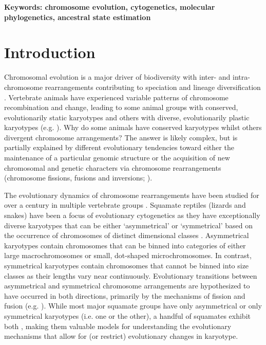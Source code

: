 \documentclass[a4paper, 12pt]{article}
\begin{document}
\textbf{Keywords: chromosome evolution, cytogenetics, molecular phylogenetics, ancestral state estimation}


\section{Introduction}\label{main}

Chromosomal evolution is a major driver of biodiversity with inter- and intra-chromosome rearrangements contributing to speciation and lineage diversification \citep{pellestor2020chromoanagenesis}. 
Vertebrate animals have experienced variable patterns of chromosome recombination and change, leading to some animal groups with conserved, evolutionarily static karyotypes and others with diverse, evolutionarily plastic karyotypes (e.g. \citealt{graphodatsky2011genome,neto2011extensive,mezzasalma2019changes,degrandi2020distribution,mayrose2021evolution}).
Why do some animals have conserved karyotypes whilst others divergent chromosome arrangements? 
The answer is likely complex, but is partially explained by different evolutionary tendencies toward either the maintenance of a particular genomic structure or the acquisition of new chromosomal and genetic characters via chromosome rearrangements (chromosome fissions, fusions and inversions; \citealt{crombach2007chromosome,amorim2021new}).

The evolutionary dynamics of chromosome rearrangements have been studied for over a century in multiple vertebrate groups \citep{damas2021vertebrate}. 
Squamate reptiles (lizards and snakes) have been a focus of evolutionary cytogenetics as they have exceptionally diverse karyotypes that can be either ‘asymmetrical’ or ‘symmetrical’ based on the occurrence of chromosomes of distinct dimensional classes \citep{stebbins1950chapter,white1973}. 
Asymmetrical karyotypes contain chromosomes that can be binned into categories of either large macrochromosomes or small, dot-shaped microchromosomes.
In contrast, symmetrical karyotypes contain chromosomes that cannot be binned into size classes as their lengths vary near continuously. 
Evolutionary transitions between asymmetrical and symmetrical chromosome arrangements are hypothesized to have occurred in both directions, primarily by the mechanisms of fission and fusion (e.g. \citealt{olmo2008trends,srikulnath2015karyotype}). 
While most major squamate groups have only asymmetrical or only symmetrical karyotypes (i.e. one or the other), a handful of squamates exhibit both \citep{mezzasalma2021lizards}, making them valuable models for understanding the evolutionary mechanisms that allow for (or restrict) evolutionary changes in karyotype.    
\end{document}
